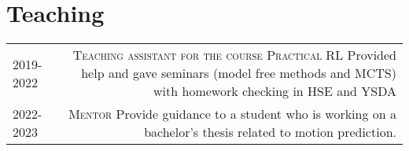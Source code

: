 \section*{\sectionformat Teaching}
\begin{tabular}{@{}L!{\VRule}R}
    2019-2022  {} &
    {\textsc{Teaching assistant for the course Practical RL}} Provided help and gave seminars (model free methods and MCTS) with homework checking in HSE and YSDA
\\
    2022-2023 {} 
    & {\textsc{Mentor}} Provide guidance to a student who is working on a bachelor's thesis related to motion prediction.
\end{tabular}

